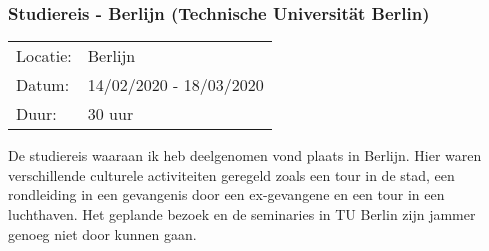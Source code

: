 \subsubsection{Studiereis - Berlijn (Technische Universität Berlin)}

\begin{tabular}{l l}
  Locatie: & Berlijn\\
  Datum: & 14/02/2020 - 18/03/2020\\
  Duur: & 30 uur
\end{tabular}

De studiereis waaraan ik heb deelgenomen vond plaats in Berlijn. Hier waren verschillende culturele activiteiten geregeld zoals een tour in de stad, een rondleiding in een gevangenis door een ex\hyp{}gevangene en een tour in een luchthaven. Het geplande bezoek en de seminaries in TU Berlin zijn jammer genoeg niet door kunnen gaan.